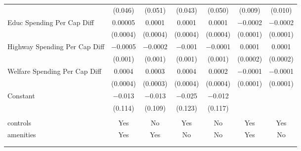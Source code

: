 \begin{table}[!htbp]
\begin{tabular}{@{\extracolsep{5pt}}lcccccc}
  & (0.046) & (0.051) & (0.043) & (0.050) & (0.009) & (0.010) \\ 
  Educ Spending Per Cap Diff & 0.00005 & 0.0001 & 0.0001 & 0.0001 & $-$0.0002 & $-$0.0002 \\ 
  & (0.0004) & (0.0004) & (0.0004) & (0.0004) & (0.0001) & (0.0001) \\ 
  Highway Spending Per Cap Diff & $-$0.0005 & $-$0.0002 & $-$0.001 & $-$0.0001 & 0.0001 & 0.0001 \\ 
  & (0.001) & (0.001) & (0.001) & (0.001) & (0.0002) & (0.0002) \\ 
  Welfare Spending Per Cap Diff & 0.0004 & 0.0003 & 0.0004 & 0.0002 & $-$0.0001 & $-$0.0001 \\ 
  & (0.0004) & (0.0003) & (0.0004) & (0.0004) & (0.0001) & (0.0001) \\ 
  Constant & $-$0.013 & $-$0.013 & $-$0.025 & $-$0.012 &  &  \\ 
  & (0.114) & (0.109) & (0.123) & (0.117) &  &  \\ 
 \hline \\[-1.8ex] 
controls & Yes & No & Yes & No & Yes & Yes \\ 
amenities & Yes & Yes & No & No & Yes & No \\ 
\hline \\[-1.8ex] 
\hline 
\hline \\[-1.8ex] 
\end{tabular} 
\end{table} 
